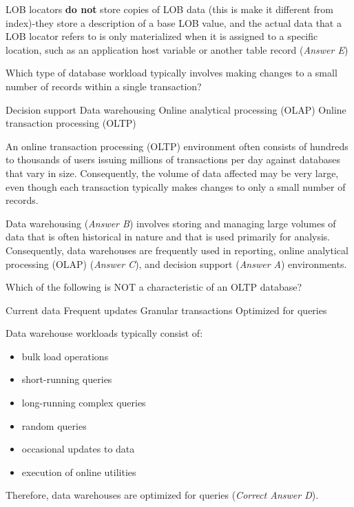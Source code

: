 \documentclass[answers, 11pt]{exam}
\begin{document}
\begin{questions}
\begin{solution}
LOB locators \textbf{do not} store copies of LOB data (this is make it different from index)-they
store a description of a base LOB value, and the actual data that a LOB locator refers to is only
materialized when it is assigned to a specific location, such as an application host variable or
another table record (\textit{Answer E})


\end{solution}

\question[1]
Which type of database workload typically involves making changes to a small number of records within
a single transaction?
\begin{choices}
\choice Decision support
\choice Data warehousing
\choice Online analytical processing (OLAP)
\CorrectChoice Online transaction processing (OLTP)
\end{choices}

\begin{solution}
An online transaction processing (OLTP) environment often consists of hundreds to thousands of
users issuing millions of transactions per day against databases that vary in size.
Consequently, the volume of data affected may be very large, even though {\color{red} each transaction
typically makes changes to only a small number of records}.
\par

Data warehousing (\textit{Answer B}) involves storing and managing large volumes of data that is often 
historical in nature and that is used primarily for analysis. Consequently, data warehouses are frequently
used in reporting, online analytical processing (OLAP) (\textit{Answer C}), and decision support 
(\textit{Answer A}) environments.


\end{solution}


\question[1]
Which of the following is NOT a characteristic of an OLTP database?
\begin{choices}
\choice Current data
\choice Frequent updates
\choice Granular transactions
\CorrectChoice Optimized for queries
\end{choices}

\begin{solution}
Data warehouse workloads typically consist of:
\begin{itemize}
\item bulk load operations
\item short-running queries
\item long-running complex queries
\item random queries
\item occasional updates to data
\item execution of online utilities
\end{itemize}
Therefore, data warehouses are optimized for queries (\textit{Correct Answer D}).
\par


\end{solution}
\end{questions}
\end{document}
